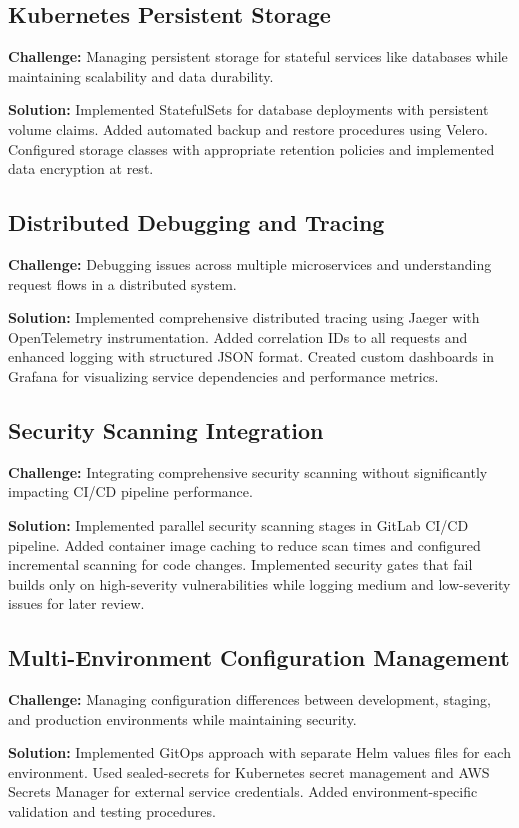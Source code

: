 \subsection{Kubernetes Persistent Storage}
\textbf{Challenge:} Managing persistent storage for stateful services like databases while maintaining scalability and data durability.

\textbf{Solution:} Implemented StatefulSets for database deployments with persistent volume claims. Added automated backup and restore procedures using Velero. Configured storage classes with appropriate retention policies and implemented data encryption at rest.

\subsection{Distributed Debugging and Tracing}
\textbf{Challenge:} Debugging issues across multiple microservices and understanding request flows in a distributed system.

\textbf{Solution:} Implemented comprehensive distributed tracing using Jaeger with OpenTelemetry instrumentation. Added correlation IDs to all requests and enhanced logging with structured JSON format. Created custom dashboards in Grafana for visualizing service dependencies and performance metrics.

\subsection{Security Scanning Integration}
\textbf{Challenge:} Integrating comprehensive security scanning without significantly impacting CI/CD pipeline performance.

\textbf{Solution:} Implemented parallel security scanning stages in GitLab CI/CD pipeline. Added container image caching to reduce scan times and configured incremental scanning for code changes. Implemented security gates that fail builds only on high-severity vulnerabilities while logging medium and low-severity issues for later review.

\subsection{Multi-Environment Configuration Management}
\textbf{Challenge:} Managing configuration differences between development, staging, and production environments while maintaining security.

\textbf{Solution:} Implemented GitOps approach with separate Helm values files for each environment. Used sealed-secrets for Kubernetes secret management and AWS Secrets Manager for external service credentials. Added environment-specific validation and testing procedures.

